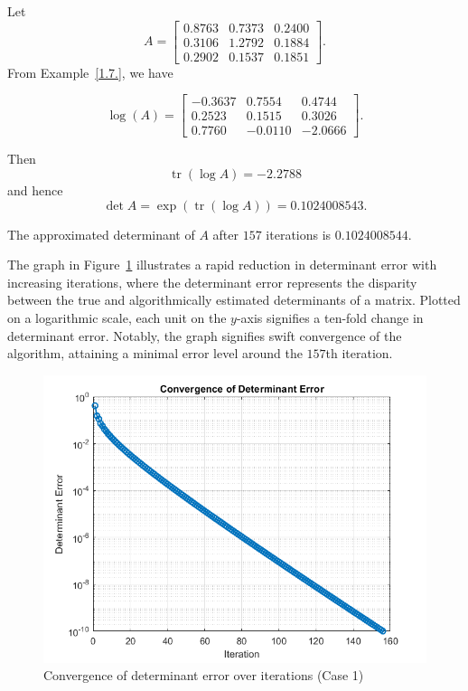 \begin{example}
    Let
\[
A = \begin{bmatrix}
    0.8763 & 0.7373 & 0.2400 \\
    0.3106 & 1.2792 & 0.1884 \\
    0.2902 & 0.1537 & 0.1851
\end{bmatrix}.
\]
\newline
From Example~\ref{1.7.}, we have

$$\log(A)=
\begin{bmatrix}
   -0.3637 & 0.7554 & 0.4744 \\
    0.2523 & 0.1515 & 0.3026 \\
    0.7760 & -0.0110 & -2.0666
\end{bmatrix}
.$$

Then
\[\operatorname{tr}(\log A) = -2.2788\]
and hence 
\[\det A = \exp(\operatorname{tr}(\log A)) = 0.1024008543.\]

The approximated determinant of $A$ after $157$ iterations is $0.1024008544$.

The graph in Figure~\ref{graph-appdet-01} illustrates a rapid reduction in determinant error with increasing iterations, where the determinant error represents the disparity between the true and algorithmically estimated determinants of a matrix. Plotted on a logarithmic scale, each unit on the $y$-axis signifies a ten-fold change in determinant error. Notably, the graph signifies swift convergence of the algorithm, attaining a minimal error level around the $157$th iteration.

\begin{center}
    \begin{figure}[h] 
        \centering
        \includegraphics[width=0.8\linewidth]{Figures/determinant_error_plot_1.png}
        \caption{Convergence of determinant error over iterations (Case 1)}
        \label{graph-appdet-01}
    \end{figure}
\end{center}
\end{example}
